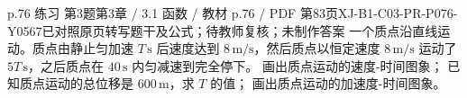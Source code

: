 \par\noindent\begin{minipage}{\linewidth}
\begin{bankitem}{p.76 练习 第3题}{第3章 / 3.1 函数 / 教材 p.76 / PDF 第83页}{XJ-B1-C03-PR-P076-Y0567}{已对照原页转写题干及公式；待教师复核；未制作答案}
一个质点沿直线运动。质点由静止匀加速 $T\,\mathrm s$ 后速度达到 $8\,\mathrm{m/s}$，然后质点以恒定速度 $8\,\mathrm{m/s}$ 运动了 $5T\,\mathrm s$，之后质点在 $40\,\mathrm s$ 内匀减速到完全停下。
画出质点运动的速度-时间图象；
已知质点运动的总位移是 $600\,\mathrm m$，求 $T$ 的值；
画出质点运动的加速度-时间图象。
\end{bankitem}
\end{minipage}\par\medskip
